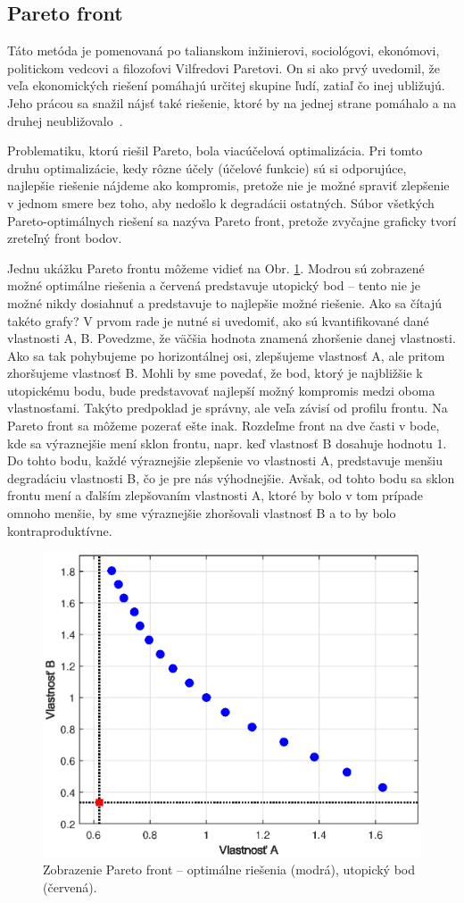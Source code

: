 \subsection{Pareto front}
Táto metóda je pomenovaná po talianskom inžinierovi, sociológovi, ekonómovi, politickom vedcovi a filozofovi Vilfredovi Paretovi. On si ako prvý uvedomil, že veľa ekonomických riešení pomáhajú určitej skupine ľudí, zatiaľ čo inej ubližujú. Jeho prácou sa snažil nájsť také riešenie, ktoré  by na jednej strane pomáhalo a na druhej neubližovalo~\cite{mornati:pareto_opt:2013}. 

Problematiku, ktorú riešil Pareto, bola viacúčelová optimalizácia. Pri tomto druhu optimalizácie, kedy rôzne účely (účelové funkcie) sú si odporujúce, najlepšie riešenie nájdeme ako kompromis, pretože nie je možné spraviť zlepšenie v jednom smere bez toho, aby nedošlo k degradácii ostatných. Súbor všetkých Pareto-optimálnych riešení sa nazýva Pareto front, pretože zvyčajne graficky tvorí zreteľný front bodov.

Jednu ukážku Pareto frontu môžeme vidieť na Obr. \ref{fig:Pareto_example}. Modrou sú zobrazené možné optimálne riešenia a červená predstavuje utopický bod -- tento nie je možné nikdy dosiahnuť a predstavuje to najlepšie možné riešenie. Ako sa čítajú takéto grafy? V prvom rade je nutné si uvedomiť, ako sú kvantifikované dané vlastnosti A, B. Povedzme, že väčšia hodnota znamená zhoršenie danej vlastnosti. Ako sa tak pohybujeme po horizontálnej osi, zlepšujeme vlastnosť A, ale pritom zhoršujeme vlastnosť B. Mohli by sme povedať, že bod, ktorý je najbližšie k utopickému bodu, bude predstavovať najlepší možný kompromis medzi oboma vlastnosťami. Takýto predpoklad je správny, ale veľa závisí od profilu frontu. Na Pareto front sa môžeme pozerať ešte inak. Rozdeľme front na dve časti v bode, kde sa výraznejšie mení sklon frontu, napr. keď vlastnosť B dosahuje hodnotu 1. Do tohto bodu, každé výraznejšie zlepšenie vo vlastnosti A, predstavuje menšiu degradáciu vlastnosti B, čo je pre nás výhodnejšie. Avšak, od tohto bodu sa sklon frontu mení a ďalším zlepšovaním vlastnosti A, ktoré by bolo v tom prípade omnoho menšie, by sme výraznejšie zhoršovali vlastnosť B a to by bolo kontraproduktívne.
\begin{figure}
	\centering
	\includegraphics[width=0.7\linewidth]{images/Pareto_ex}
	\caption{Zobrazenie Pareto front -- optimálne riešenia (modrá), utopický bod (červená).}
	\label{fig:Pareto_example}
\end{figure}

